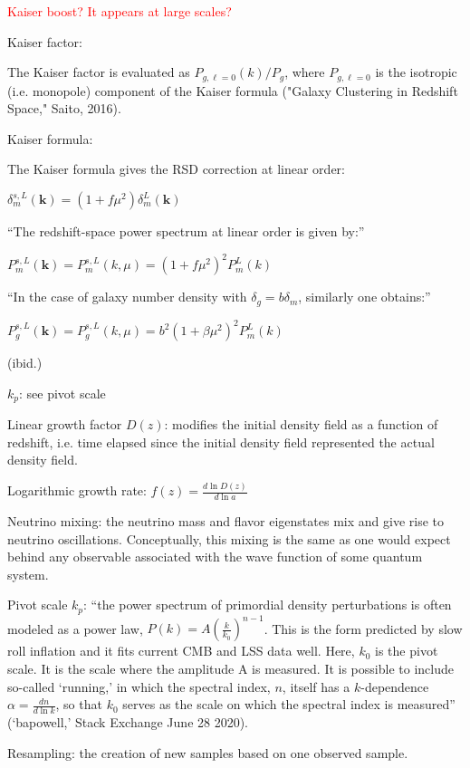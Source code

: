 \documentclass[11pt]{article}
\begin{document}
\textcolor{red}{Kaiser boost? It appears at large scales?}

Kaiser factor:

The Kaiser factor is evaluated as $P_{g, \ell=0} (k) / P_g$, where
$P_{g, \ell=0}$ is the isotropic (i.e. monopole) component of the Kaiser
formula ("Galaxy Clustering in Redshift Space," Saito, 2016).

Kaiser formula:

The Kaiser formula gives the RSD correction at linear order:

$\delta_m^{s, L} (\bm{k}) = (1 + f \mu^2) \delta_m^L (\bm{k})$

``The redshift-space power spectrum at linear order is given by:''

$P_m^{s, L} (\bm{k}) = P_m^{s, L} (k, \mu) = (1 + f \mu^2)^2 P_m^L (k)$

``In the case of galaxy number density with $\delta_g = b \delta_m$, similarly
one obtains:''

$
P_g^{s, L} (\bm{k})
=
P_g^{s, L} (k, \mu)
=
b^2 (1 + \beta \mu^2)^2 P_m^L (k)
$

(ibid.)

$k_p$: see pivot scale

Linear growth factor $D(z)$: modifies the initial density field as a function
    of redshift, i.e. time elapsed since the initial density field represented
    the actual density field.

Logarithmic growth rate: $f(z) = \frac{d \ln D(z)}{d \ln a}$

Neutrino mixing: the neutrino mass and flavor eigenstates mix and give rise
to neutrino oscillations. Conceptually, this mixing is the same as  one would
expect behind any observable associated with the wave function of some quantum
system.

Pivot scale $k_p$: ``the power spectrum of primordial density perturbations is
often modeled as a power law, $P(k) = A \left( \frac{k}{k_0} \right)^{n - 1}$.
This is the form predicted by slow roll inflation and it fits current CMB and
LSS data well. Here, $k_0$ is the pivot scale. It is the scale where the
amplitude A is measured. It is possible to include so-called `running,' in
which the spectral index, $n$, itself has a $k$-dependence
$\alpha = \frac{dn}{d \ln k}$, so that $k_0$ serves as the scale on which the
spectral index is measured'' (`bapowell,' Stack Exchange June 28 2020).

Resampling: the creation of new samples based on one observed sample.
\end{document}
